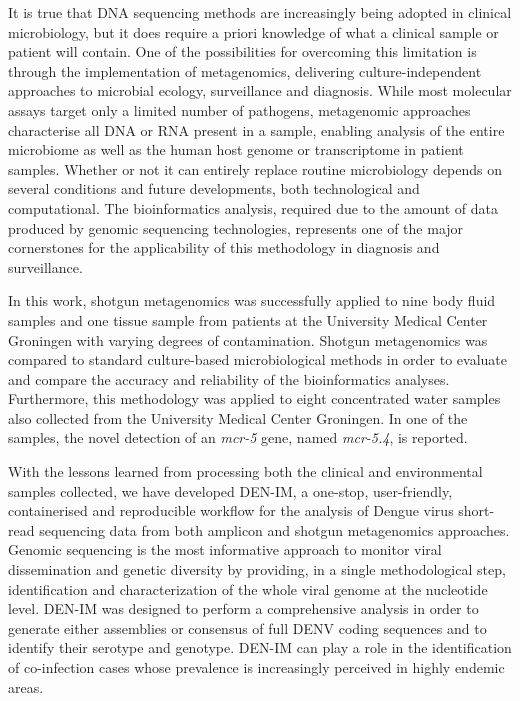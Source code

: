 It is true that DNA sequencing methods are increasingly being adopted in clinical microbiology, but it does require a priori knowledge of what a clinical sample or patient will contain. One of the possibilities for overcoming this limitation is through the implementation of metagenomics, delivering culture-independent approaches to microbial ecology, surveillance and diagnosis. While most molecular assays target only a limited number of pathogens, metagenomic approaches characterise all DNA or RNA present in a sample, enabling analysis of the entire microbiome as well as the human host genome or transcriptome in patient samples. Whether or not it can entirely replace routine microbiology depends on several conditions and future developments, both technological and computational. The bioinformatics analysis, required due to the amount of data produced by genomic sequencing technologies, represents one of the major cornerstones for the applicability of this methodology in diagnosis and surveillance. 

In this work, shotgun metagenomics was successfully applied to nine body fluid samples and one tissue sample from patients at the University Medical Center Groningen with varying degrees of contamination. Shotgun metagenomics was compared to standard culture-based microbiological methods in order to evaluate and compare the accuracy and reliability of the bioinformatics analyses. Furthermore, this methodology was applied to eight concentrated water samples also collected from the University Medical Center Groningen. In one of the samples, the novel detection of an \textit{mcr-5} gene, named \textit{mcr-5.4}, is reported.

With the lessons learned from processing both the clinical and environmental samples collected, we have developed DEN-IM, a one-stop, user-friendly, containerised and reproducible workflow for the analysis of Dengue virus short-read sequencing data from both amplicon and shotgun metagenomics approaches. Genomic sequencing is the most informative approach to monitor viral dissemination and genetic diversity by providing, in a single methodological step, identification and characterization of the whole viral genome at the nucleotide level. DEN-IM was designed to perform a comprehensive analysis in order to generate either assemblies or consensus of full DENV coding sequences and to identify their serotype and genotype. DEN-IM can play a role in the identification of co-infection cases whose prevalence is increasingly perceived in highly endemic areas.


